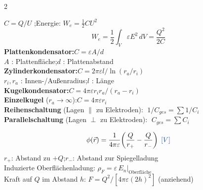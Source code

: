 \documentclass[a4paper, 7.5pt]{extarticle}
\begin{document}
\begin{multicols*}{2}
\begin{tcolorbox}[title={Kapazitäten -- alle Geometrien}]
$C = Q/U$ \;\text{\textcolor{boxtitle}{[\(F = As/V\)]}};\quad Energie: $W_e = \tfrac{1}{2}CU^2$ \;\text{\textcolor{boxtitle}{[\(J\)]}}
$$W_e = \frac{1}{2}\int_V\varepsilon E^2\,dV = \frac{Q^2}{2C}$$
\textbf{Plattenkondensator:}\quad $C = \varepsilon A/d$\\
\phantom{x}$A$ \;\text{\textcolor{boxtitle}{[\(m^2\)]}}: Plattenfläche;\quad $d$ \;\text{\textcolor{boxtitle}{[\(m\)]}}: Plattenabstand\\[2pt]
\textbf{Zylinderkondensator:}\quad $C = 2\pi\varepsilon l/\ln(r_a/r_i)$\\
\phantom{x}$r_i, r_a$ \;\text{\textcolor{boxtitle}{[\(m\)]}}: Innen-/Außenradius;\quad $l$ \;\text{\textcolor{boxtitle}{[\(m\)]}}: Länge\\[2pt]
\textbf{Kugelkondensator:}\quad $C = 4\pi\varepsilon r_i r_a/(r_a-r_i)$\\[2pt]
\textbf{Einzelkugel} ($r_a\to\infty$):\quad $C = 4\pi\varepsilon r_i$\\[3pt]
\textbf{Reihenschaltung} (Lagen $\parallel$ zu Elektroden):
$\;1/C_{ges} = \sum 1/C_i$\\
\textbf{Parallelschaltung} (Lagen $\perp$ zu Elektroden):
$\;C_{ges} = \sum C_i$
\end{tcolorbox}

\begin{tcolorbox}[title={Spiegelungsmethode}]
\begin{center}
\end{center}
$$\phi(\vec{r}) = \frac{1}{4\pi\varepsilon}\!\left(\frac{Q}{r_+} - \frac{Q}{r_-}\right) \;\text{\textcolor{boxtitle}{[\(V\)]}}$$
$r_+$: Abstand zu $+Q$;\quad $r_-$: Abstand zur Spiegelladung\\
Induzierte Oberflächenladung: $\rho_F = \varepsilon\,E_n\big|_{\text{Oberfläche}}$\\
Kraft auf $Q$ im Abstand $h$: $F = Q^2/[4\pi\varepsilon(2h)^2]$ (anziehend)
\end{tcolorbox}


\end{multicols*}
\end{document}
